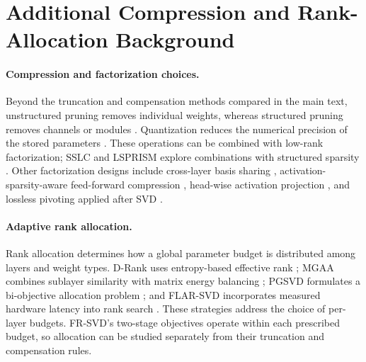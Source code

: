 

\section{Additional Compression and Rank-Allocation Background}\label{app:related-work}

\paragraph{Compression and factorization choices.}
Beyond the truncation and compensation methods compared in the main text, unstructured pruning removes individual weights, whereas structured pruning removes channels or modules \citep{frantar2023sparsegpt,ma2023llmpruner,ashkboos2024slicegpt}. Quantization reduces the numerical precision of the stored parameters \citep{frantar2023gptq,lin2023awq}. These operations can be combined with low-rank factorization; SSLC and LSPRISM explore combinations with structured sparsity \citep{zong2025sslc,tao2025lsprism}. Other factorization designs include cross-layer basis sharing \citep{wang2024basissharing}, activation-sparsity-aware feed-forward compression \citep{huang2025sola}, head-wise activation projection \citep{tian2025flatllm}, and lossless pivoting applied after SVD \citep{zhao2025pifa}.

\paragraph{Adaptive rank allocation.}
Rank allocation determines how a global parameter budget is distributed among layers and weight types. D-Rank uses entropy-based effective rank \citep{mi2025drank}; MGAA combines sublayer similarity with matrix energy balancing \citep{li2025mgaa}; PGSVD formulates a bi-objective allocation problem \citep{solgi2025pgsvd}; and FLAR-SVD incorporates measured hardware latency into rank search \citep{thoma2025flarsvd}. These strategies address the choice of per-layer budgets. FR-SVD's two-stage objectives operate within each prescribed budget, so allocation can be studied separately from their truncation and compensation rules.
